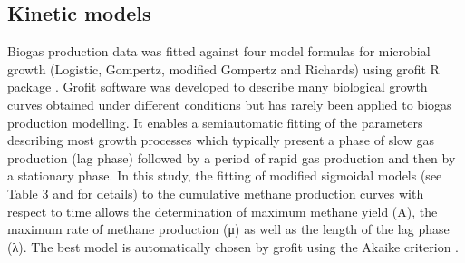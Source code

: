 \subsection{Kinetic models}
Biogas production data was fitted against four model formulas for microbial growth (Logistic, Gompertz, modified Gompertz and Richards) using grofit R package \cite{Kahm_2010}. Grofit software was developed to describe many biological growth curves obtained under different conditions but has rarely been applied to biogas production modelling. It enables a semiautomatic fitting of the parameters describing most growth processes which typically present a phase of slow gas production (lag phase) followed by a period of rapid gas production and then by a stationary phase. In this study, the fitting of modified sigmoidal models (see Table 3 and \cite{Zwietering1990} for details) to the cumulative methane production curves  with respect to time allows the determination of maximum methane yield (A), the maximum rate of methane production (μ) as well as the length of the lag phase (λ). The best model is automatically chosen by grofit using the Akaike criterion \cite{Hasenbrink_2006}.